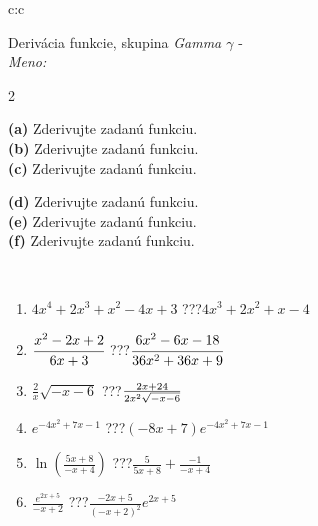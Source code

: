 \documentclass[10pt]{report}
\begin{document}
\newpage
\thispagestyle{empty}
\begin{tabular}{c:c}
\begin{minipage}[c][104.5mm][t]{0.5\linewidth}
\begin{center}
\vspace{7mm}
{\huge Derivácia funkcie, skupina \textit{Gamma $\gamma$} -}\\[5mm]
\textit{Meno:}\phantom{xxxxxxxxxxxxxxxxxxxxxxxxxxxxxxxxxxxxxxxxxxxxxxxxxxxxxxxxxxxxxxxxx}\\[5mm]
\begin{minipage}{0.95\linewidth}
\begin{center}
{\small \begin{multicols}{2} \raggedright
\textbf{(a)} Zderivujte zadanú funkciu. \\[1mm]
\textbf{(b)} Zderivujte zadanú funkciu. \\[1mm]
\textbf{(c)} Zderivujte zadanú funkciu. \par \columnbreak
\textbf{(d)} Zderivujte zadanú funkciu. \\[1mm]
\textbf{(e)} Zderivujte zadanú funkciu. \\[1mm]
\textbf{(f)} Zderivujte zadanú funkciu.
\end{multicols}
}
\end{center}
\end{minipage}
\\[4mm]
\begin{minipage}{0.79\linewidth}
\begin{center}
\begin{varwidth}{\linewidth}
\begin{enumerate}
\normalsize
\item $4x^4+2x^3+x^2-4x+3$\quad \dotfill\; ???\;\dotfill \quad $4x^3+2x^2+x-4$
\item $\cfrac{x^2-2x+2}{6x+3}$\quad \dotfill\; ???\;\dotfill \quad $\cfrac{6x^2-6x-18}{36x^2+36x+9}$
\item $\frac{2}{x}\sqrt{-x-6}$\quad \dotfill\; ???\;\dotfill \quad $\frac{2x+24}{2x^2 \sqrt{\smash[b]{-x-6}}}$
\item $e^{-4x^2+7x-1}$\quad \dotfill\; ???\;\dotfill \quad $(-8x+7)e^{-4x^2+7x-1}$
\item $\ln{\left(\frac{5x+8}{-x+4}\right)}$\quad \dotfill\; ???\;\dotfill \quad $\frac{5}{5x+8}+\frac{-1}{-x+4}$
\item $\frac{e^{2x+5}}{-x+2}$\quad \dotfill\; ???\;\dotfill \quad $\frac{-2x+5}{(-x+2)^2}e^{2x+5}$
\end{enumerate}

\end{varwidth}
\end{center}
\end{minipage}
\end{center}
\end{minipage}
\end{tabular}
\end{document}
